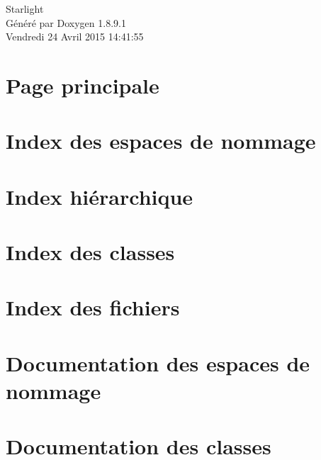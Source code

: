 \documentclass[twoside]{book}
\newcommand{\+}{\discretionary{\mbox{\scriptsize$\hookleftarrow$}}{}{}}
\newcommand{\clearemptydoublepage}{%
  \newpage{\pagestyle{empty}\cleardoublepage}%
}
\begin{document}
\hypersetup{pageanchor=false,
             bookmarks=true,
             bookmarksnumbered=true,
             pdfencoding=unicode
            }
\begin{titlepage}
\vspace*{7cm}
\begin{center}%
{\Large Starlight }\\
\vspace*{1cm}
{\large Généré par Doxygen 1.8.9.1}\\
\vspace*{0.5cm}
{\small Vendredi 24 Avril 2015 14:41:55}\\
\end{center}
\end{titlepage}
\clearemptydoublepage
\tableofcontents
\clearemptydoublepage
{}
\hypersetup{pageanchor=true}

\chapter{Page principale}
\label{index}\hypertarget{index}{}
\chapter{Index des espaces de nommage}

\chapter{Index hiérarchique}

\chapter{Index des classes}

\chapter{Index des fichiers}

\chapter{Documentation des espaces de nommage}



\chapter{Documentation des classes}




















\end{document}
